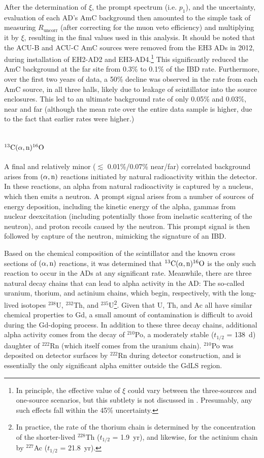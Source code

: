 \documentclass[../thesis.tex]{subfiles}
\begin{document}
After the determination of $\xi$, the prompt spectrum (i.e. $p_1$), and the uncertainty, evaluation of each AD's AmC background then amounted to the simple task of measuring $R_{\mathrm{uncorr}}$ (after correcting for the muon veto efficiency) and multiplying it by $\xi$, resulting in the final values used in this analysis. It should be noted that the ACU-B and ACU-C AmC sources were removed from the EH3 ADs in 2012, during installation of EH2-AD2 and EH3-AD4.\footnote{In principle, the effective value of $\xi$ could vary between the three-sources and one-source scenarios, but this subtlety is not discussed in \cite{Gu_2016}. Presumably, any such effects fall within the 45\% uncertainty.} This significantly reduced the AmC background at the far site from 0.3\% to 0.1\% of the IBD rate. Furthermore, over the first two years of data, a 50\% decline was observed in the rate from each AmC source, in all three halls, likely due to leakage of scintillator into the source enclosures. This led to an ultimate background rate of only 0.05\% and 0.03\%, near and far (although the mean rate over the entire data sample is higher, due to the fact that earlier rates were higher.)

\section{$^{13}\mathrm{C}(\alpha, \mathrm{n})^{16}\mathrm{O}$}
\label{sec:bkgCanO}

A final and relatively minor ($\lesssim$ 0.01\%/0.07\% near/far) correlated background arises from $(\alpha,\mathrm{n})$ reactions initiated by natural radioactivity within the detector. In these reactions, an alpha from natural radioactivity is captured by a nucleus, which then emits a neutron. A prompt signal arises from a number of sources of energy deposition, including the kinetic energy of the alpha, gammas from nuclear deexcitation (including potentially those from inelastic scattering of the neutron), and proton recoils caused by the neutron. This prompt signal is then followed by capture of the neutron, mimicking the signature of an IBD.

Based on the chemical composition of the scintillator and the known cross sections of $(\alpha,\mathrm{n})$ reactions, it was determined that $^{13}\mathrm{C}(\alpha, \mathrm{n})^{16}\mathrm{O}$ is the only such reaction to occur in the ADs at any significant rate. Meanwhile, there are three natural decay chains that can lead to alpha activity in the AD: The so-called uranium, thorium, and actinium chains, which begin, respectively, with the long-lived isotopes $^{238}$U, $^{232}$Th, and $^{235}$U\footnote{In practice, the rate of the thorium chain is determined by the concentration of the shorter-lived $^{228}$Th ($t_{1/2}$ = 1.9~yr), and likewise, for the actinium chain by $^{227}$Ac ($t_{1/2}$ = 21.8~yr).}. Given that U, Th, and Ac all have similar chemical properties to Gd, a small amount of contamination is difficult to avoid during the Gd-doping process. In addition to these three decay chains, additional alpha activity comes from the decay of $^{210}$Po, a moderately stable ($t_{1/2}$ = 138~d) daughter of $^{222}$Rn (which itself comes from the uranium chain). $^{210}$Po was deposited on detector surfaces by $^{222}$Rn during detector construction, and is essentially the only significant alpha emitter outside the GdLS region.
\end{document}
